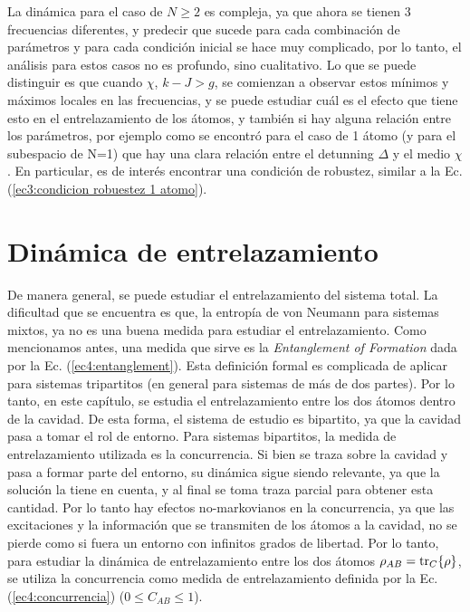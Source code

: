 La dinámica para el caso de $N\geq2$ es compleja, ya que ahora se tienen 3 frecuencias diferentes, y predecir que sucede para cada combinación de parámetros y para cada condición inicial se hace muy complicado, por lo tanto, el análisis para estos casos no es profundo, sino cualitativo. Lo que se puede distinguir es que cuando $\chi$, $k-J>g$, se comienzan a observar estos mínimos y máximos locales en las frecuencias, y se puede estudiar cuál es el efecto que tiene esto en el entrelazamiento de los átomos, y también si hay alguna relación entre los parámetros, por ejemplo como se encontró para el caso de 1 átomo (y para el subespacio de N=1) que hay una clara relación entre el detunning $\Delta$ y el medio $\chi$. En particular, es de interés encontrar una condición de robustez, similar a la Ec. (\ref{ec3:condicion robuestez 1 atomo}).

\section{Dinámica de entrelazamiento}

De manera general, se puede estudiar el entrelazamiento del sistema total. La dificultad que se encuentra es que, la entropía de von Neumann para sistemas mixtos, ya no es una buena medida para estudiar el entrelazamiento. Como mencionamos antes, una medida que sirve es la \textit{Entanglement of Formation} dada por la Ec. (\ref{ec4:entanglement}). Esta definición formal es complicada de aplicar para sistemas tripartitos (en general para sistemas de más de dos partes). Por lo tanto, en este capítulo, se estudia el entrelazamiento entre los dos átomos dentro de la cavidad. De esta forma, el sistema de estudio es bipartito, ya que la cavidad pasa a tomar el rol de entorno. Para sistemas bipartitos, la medida de entrelazamiento utilizada es la concurrencia. Si bien se traza sobre la cavidad y pasa a formar parte del entorno, su dinámica sigue siendo relevante, ya que la solución la tiene en cuenta, y al final se toma traza parcial para obtener esta cantidad. Por lo tanto hay efectos no-markovianos en la concurrencia, ya que las excitaciones y la información que se transmiten de los átomos a la cavidad, no se pierde como si fuera un entorno con infinitos grados de libertad. Por lo tanto, para estudiar la dinámica de entrelazamiento entre los dos átomos $\rho_{AB}=\tr_C\{\rho\}$, se utiliza la concurrencia como medida de entrelazamiento definida por la Ec. (\ref{ec4:concurrencia}) ($0\leq C_{AB} \leq 1$).

